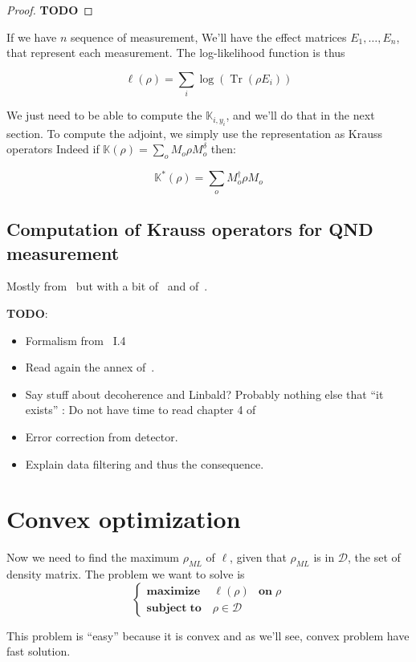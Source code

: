 \documentclass[10pt]{report}
\theoremstyle{plain}
\theoremstyle{definition}
\theoremstyle{remark}
\newcommand{\TODO}{\textbf{TODO}}
\DeclareMathOperator{\Tr}{Tr}
\newcommand{\ml}{_{M\!L}}
\newcommand{\maxim}[3]{\begin{cases}
    \mathbf{maximize}\,\quad #1& \mathbf{on}\; #2\\
    \mathbf{subject\;to}\quad #3
  \end{cases}}
\begin{document}
\begin{proof}
  \TODO{}
\end{proof}


If we have $n$ sequence of measurement, We'll have the effect
matrices $E_1, \ldots, E_n$, that represent each measurement. The log-likelihood
function is thus

\begin{equation}\label{eqn:ll}
  \ell(\rho) = \sum_i \log (\Tr(\rho E_i))
\end{equation}

We just need to be able to compute the $\mathbb K_{i,y_i}$, and we'll do that in
the next section. To compute the adjoint, we simply use the representation as
Krauss operators Indeed if $\mathbb K(\rho) = \sum\limits_o M_o\rho M_o^\delta$
then:

\[\mathbb K^*(\rho) = \sum_o M_o^\dagger \rho M_o\]

\section{Computation of Krauss operators for QND measurement}

Mostly from~\cite{VM19} but with a bit of~\cite{Har06} and of~\cite{SayPHD11}.

\TODO{}:
\begin{itemize}
  \item Formalism from~\cite{SayPHD11} I.4
  \item Read again the annex of~\cite{VM19}.
  \item Say stuff about decoherence and Linbald? Probably nothing else that ``it
    exists'' : Do not have time to read chapter 4 of~\cite{Har06}
  \item Error correction from detector.
  \item Explain data filtering and thus the consequence.
\end{itemize}

\chapter{Convex optimization}

Now we need to find the maximum $\rho\ml$ of $\ell$, given that $\rho\ml$ is in
$\mathcal{D}$, the set of density matrix. The problem we want to solve is
\[\maxim {\ell(\rho)} \rho {\rho \in \mathcal{D}}\]

This problem is ``easy'' because it is convex and as we'll see, convex problem
have fast solution.
\end{document}
